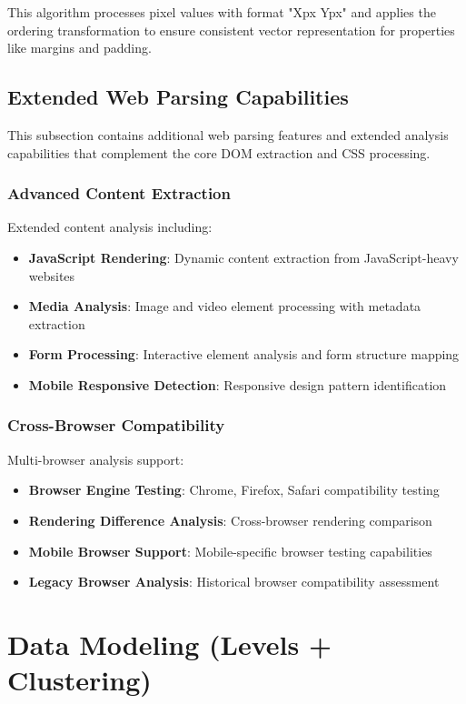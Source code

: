 This algorithm processes pixel values with format "Xpx Ypx" and applies the ordering transformation to ensure consistent vector representation for properties like margins and padding.

\subsection{Extended Web Parsing Capabilities}
\label{subsec:more-web-parsing}

This subsection contains additional web parsing features and extended analysis capabilities that complement the core DOM extraction and CSS processing.

\subsubsection{Advanced Content Extraction}
Extended content analysis including:
\begin{itemize}
    \item \textbf{JavaScript Rendering}: Dynamic content extraction from JavaScript-heavy websites
    \item \textbf{Media Analysis}: Image and video element processing with metadata extraction
    \item \textbf{Form Processing}: Interactive element analysis and form structure mapping
    \item \textbf{Mobile Responsive Detection}: Responsive design pattern identification
\end{itemize}

\subsubsection{Cross-Browser Compatibility}
Multi-browser analysis support:
\begin{itemize}
    \item \textbf{Browser Engine Testing}: Chrome, Firefox, Safari compatibility testing
    \item \textbf{Rendering Difference Analysis}: Cross-browser rendering comparison
    \item \textbf{Mobile Browser Support}: Mobile-specific browser testing capabilities
    \item \textbf{Legacy Browser Analysis}: Historical browser compatibility assessment
\end{itemize}

\section{Data Modeling (Levels + Clustering)}
\label{sec:data-modeling}

